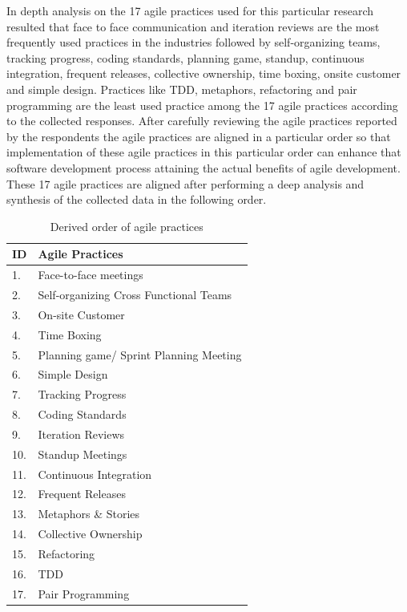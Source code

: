 \documentclass[a4paper,oneside]{bth}
\begin{document}
In depth analysis on the 17 agile practices used for this particular research resulted that face to face communication and iteration reviews are the most frequently used practices in the industries followed by self-organizing teams, tracking progress, coding standards, planning game, standup, continuous integration, frequent releases, collective ownership, time boxing, onsite customer and simple design. Practices like TDD, metaphors, refactoring and pair programming are the least used practice among the 17 agile practices according to the collected responses. After carefully reviewing the agile practices reported by the respondents the agile practices are aligned in a particular order so that implementation of these agile practices in this particular order can enhance that software development process attaining the actual benefits of agile development. These 17 agile practices are aligned after performing a deep analysis and synthesis of the collected data in the following order.
\begin{table}[h]
\centering
\caption{Derived order of agile practices}
\label{order}
\begin{tabular}{|l|l|}
\hline
\textbf{ID} & \textbf{Agile Practices}               \\ \hline
1.          & Face-to-face meetings                  \\ \hline
2.          & Self-organizing Cross Functional Teams \\ \hline
3.          & On-site Customer                       \\ \hline
4.          & Time Boxing                            \\ \hline
5.          & Planning game/ Sprint Planning Meeting \\ \hline
6.          & Simple Design                          \\ \hline
7.          & Tracking Progress                      \\ \hline
8.          & Coding Standards                       \\ \hline
9.          & Iteration Reviews                      \\ \hline
10.         & Standup Meetings                       \\ \hline
11.         & Continuous Integration                 \\ \hline
12.         & Frequent Releases                      \\ \hline
13.         & Metaphors \& Stories                   \\ \hline
14.         & Collective Ownership                   \\ \hline
15.         & Refactoring                            \\ \hline
16.         & TDD                                    \\ \hline
17.         & Pair Programming                       \\ \hline
\end{tabular}
\end{table}
\end{document}
